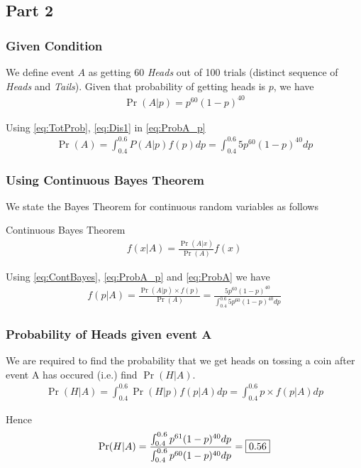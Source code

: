 \documentclass{beamer}
\begin{document}
\subsection{Part 2}
\begin{frame}
  \frametitle{Given Condition}
  We define event $A$ as getting 60 \emph{Heads} out of 100 trials (distinct sequence of \emph{Heads} and \emph{Tails}). Given that probability of getting heads is $p$, we have
  \begin{align}
    \Pr(A|p) = p^{60}(1-p)^{40}
    \label{eq:ProbA_p}
  \end{align}

  Using
  \eqref{eq:TotProb},
  \eqref{eq:Dis1}
  in
  \eqref{eq:ProbA_p}
  \begin{align}
    \Pr(A) = \int_{0.4}^{0.6} P(A|p)f(p) dp = \int_{0.4}^{0.6} 5p^{60}(1-p)^{40} dp
    \label{eq:ProbA}
  \end{align}
  
\end{frame}

\begin{frame}
  \frametitle{Using Continuous Bayes Theorem}
  We state the Bayes Theorem for continuous random variables as follows
  \begin{block}{Continuous Bayes Theorem}
    \begin{align}
      f(x|A) = \frac{\Pr(A|x)}{\Pr(A)}f(x)
      \label{eq:ContBayes}
    \end{align}
  \end{block}

  Using
  \eqref{eq:ContBayes},
  \eqref{eq:ProbA_p}
  and
  \eqref{eq:ProbA}
  we have
  \begin{align}
    f(p|A) = \frac{\Pr(A|p) \times f(p)}{\Pr(A)} = \frac{5p^{60}(1-p)^{40}}{\int_{0.4}^{0.6} 5p^{60}(1-p)^{40} dp}
    \label{eq:Dis2}
  \end{align}
\end{frame}

\begin{frame}
  \frametitle{Probability of Heads given event A}
  We are required to find the probability that we get heads on tossing a coin after event A has occured (i.e.) find $\Pr(H|A)$.
  \begin{align}
    \Pr(H|A) = \int_{0.4}^{0.6} \Pr(H|p)f(p|A) dp = \int_{0.4}^{0.6} p\times f(p|A) dp
    \label{eq:FinalHead}
  \end{align}

  Hence
  \begin{align}
    \Pr(H|A) = \frac{\int_{0.4}^{0.6} p^{61}(1-p)^{40} dp}{\int_{0.4}^{0.6} p^{60}(1-p)^{40} dp} = \fbox{0.56}
  \end{align}
    
\end{frame}
\end{document}
